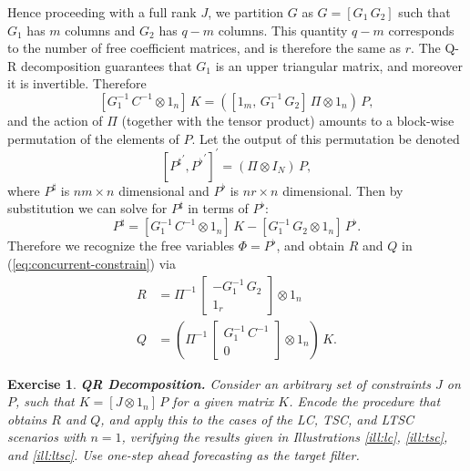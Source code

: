 \documentclass[a4paper]{book}
\newtheorem{Exercise}{Exercise}
\begin{document}
 Hence  proceeding with a full rank $J$, we partition $G$ as $G = [ G_1 \, G_2]$ 
 such that $G_1$ has $m$ columns and $G_2$
 has $q-m$ columns.  This quantity $q-m$ corresponds to the number 
 of free coefficient matrices, and is therefore the same as $r$.
 The Q-R decomposition guarantees that $G_1$ is an upper triangular matrix, 
 and moreover it is invertible.   Therefore
 \[
  \left[ G_1^{-1} \, C^{-1} \otimes 1_n \right] \, K  = 
  \left( \left[ 1_m , \, G_1^{-1} \, G_2 \right] \, \Pi \otimes 1_n  \right) \, P,
\]
 and the action of $\Pi$ (together with the tensor product) amounts
 to a block-wise permutation of the elements of $P$.
  Let the output of this permutation be denoted
\[
   { \left[ { P^{\sharp} }^{\prime},  {  P^{\flat} }^{\prime}  \right] }^{\prime} =
 \left( \Pi \otimes I_N \right) \, P,
\]
 where $ {P}^{\sharp}$ is $n m \times n$ dimensional and 
 $ P^{\flat}$ is $n r \times n$ dimensional.  
 Then  by substitution we can solve for $P^{\sharp}$ in terms of $P^{\flat}$:
\[
  P^{\sharp} =  \left[ G_1^{-1} \, C^{-1} \otimes 1_n \right] \, 
  K - \left[  G_1^{-1} \, G_2  \otimes 1_n   \right] \, P^{\flat}.
\]
 Therefore we recognize the free variables $\Phi = P^{\flat}$,
 and obtain $R$ and $Q$ in (\ref{eq:concurrent-constrain}) via
\begin{align*}
   R & = \Pi^{-1} \, \left[ \begin{array}{c} - G_1^{-1} \, G_2 \\ 1_{r} \end{array} \right] \otimes 1_n  \\
  Q & = \left( \Pi^{-1}  \, \left[ \begin{array}{c}  G_1^{-1} \, C^{-1} \\ 0 \end{array} \right] \otimes 1_n  \right) \, K.
\end{align*}
   
 \begin{Exercise} {\bf QR Decomposition.} \rm
 \label{exer:qr.constraint}
  Consider an arbitrary set of constraints $J$ on $P$, such that
    $   K = [ J \otimes 1_n ] \, P$ for a given matrix $K$.  
    Encode the procedure that obtains $R$ and $Q$, and apply this
    to the cases of the LC, TSC, and LTSC scenarios with $n=1$, verifying the results
    given in Illustrations \ref{ill:lc}, \ref{ill:tsc}, and \ref{ill:ltsc}.
    Use one-step ahead forecasting as the target filter.
 \end{Exercise}
 
\end{document}
